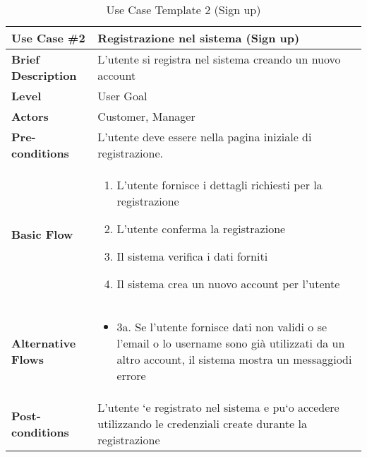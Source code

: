 \documentclass{article}
\begin{document}
\begin{table}[h!]
    \centering
    \begin{tabular}{|l|p{10cm}|}
        \hline
        \textbf{Use Case \#2} & Registrazione nel sistema (Sign up) \\ \hline
        \textbf{Brief Description} & L’utente si registra nel sistema creando un nuovo account\\ \hline
        \textbf{Level} & User Goal \\ \hline
        \textbf{Actors} & Customer, Manager \\ \hline
        \textbf{Pre-conditions} & L’utente deve essere nella pagina iniziale di registrazione. \\ \hline
        \textbf{Basic Flow} & 
        \begin{enumerate}
            \item L’utente fornisce i dettagli richiesti per la registrazione
            \item L’utente conferma la registrazione
            \item Il sistema verifica i dati forniti
            \item Il sistema crea un nuovo account per l’utente
        \end{enumerate} \\ \hline
        \textbf{Alternative Flows} & 
        \begin{itemize}
            \item 3a. Se l’utente fornisce dati non validi o se l’email o lo username sono già utilizzati da un altro account, il sistema mostra un messaggiodi errore
        \end{itemize} \\ \hline
        \textbf{Post-conditions} &L’utente `e registrato nel sistema e pu`o accedere utilizzando le credenziali create durante la registrazione \\ \hline
    \end{tabular}
    \caption{Use Case Template 2 (Sign up)}
    \label{tab:use_case_2}
\end{table}
\newpage
\end{document}
